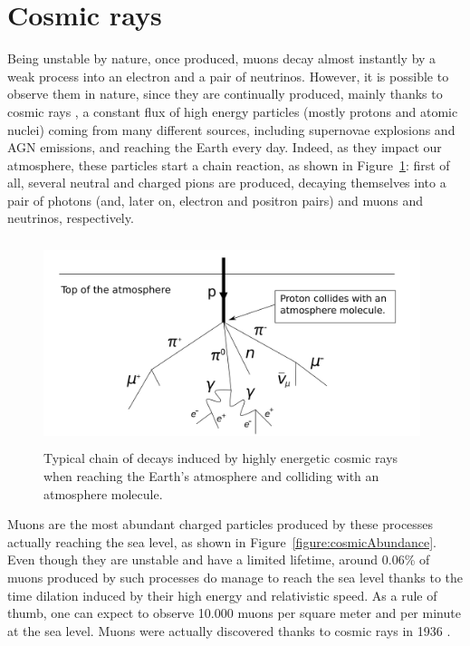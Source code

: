 \documentclass[a4paper, 11pt]{report}
\begin{document}
\section{Cosmic rays} \label{sec:cosmicRays}

Being unstable by nature, once produced, muons decay almost instantly by a weak process into an electron and a pair of neutrinos. However, it is possible to observe them in nature, since they are continually produced, mainly thanks to cosmic rays \cite{cosmicPDG}, a constant flux of high energy particles (mostly protons and atomic nuclei) coming from many different sources, including supernovae explosions and AGN emissions, and reaching the Earth every day. Indeed, as they impact our atmosphere, these particles start a chain reaction, as shown in Figure~\ref{figure:cosmic}: first of all, several neutral and charged pions are produced, decaying themselves into a pair of photons (and, later on, electron and positron pairs) and muons and neutrinos, respectively.

\begin{figure}[htbp]
\begin{center}
\includegraphics[width=11cm, height=6cm]{figs/cosmic.png}
\caption{Typical chain of decays induced by highly energetic cosmic rays when reaching the Earth's atmosphere and colliding with an atmosphere molecule.}
\label{figure:cosmic}
\end{center}
\end{figure}

\newpage
Muons are the most abundant charged particles produced by these processes actually reaching the sea level, as shown in Figure~\ref{figure:cosmicAbundance}. Even though they are unstable and have a limited lifetime, around 0.06\% of muons produced by such processes do manage to reach the sea level thanks to the time dilation induced by their high energy and relativistic speed. As a rule of thumb, one can expect to observe 10.000 muons per square meter and per minute at the sea level. Muons were actually discovered thanks to cosmic rays in 1936 \cite{muonDiscovery}.
\end{document}
